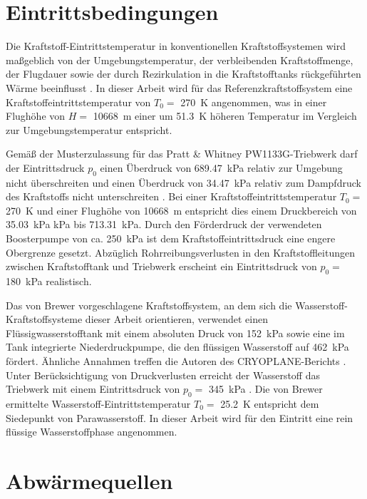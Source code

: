 \section{Eintrittsbedingungen}

Die Kraftstoff-Eintrittstemperatur in konventionellen Kraftstoffsystemen wird maßgeblich von der Umgebungstemperatur, der verbleibenden Kraftstoffmenge, der Flugdauer sowie der durch Rezirkulation in die Kraftstofftanks rückgeführten Wärme beeinflusst \cite{German.2012}. In dieser Arbeit wird für das Referenzkraftstoffsystem eine Kraftstoffeintrittstemperatur von $T_0=$ \SI{270}{\K} angenommen, was in einer Flughöhe von $H= $ \SI{10668}{\m} einer um \SI{51.3}{\K} höheren Temperatur im Vergleich zur Umgebungstemperatur entspricht. 

Gemäß der Musterzulassung für das Pratt \& Whitney PW1133G-Triebwerk darf der Eintrittsdruck $p_0$ einen Überdruck von \SI{689.47}{\kilo\Pa} relativ zur Umgebung nicht überschreiten und einen Überdruck von \SI{34.47}{\kilo\Pa} relativ zum Dampfdruck des Kraftstoffs nicht unterschreiten \cite{EASA.2018}. Bei einer Kraftstoffeintrittstemperatur $T_0=$ \SI{270}{\K} und einer Flughöhe von \SI{10668}{\m} entspricht dies einem Druckbereich von \SI{35.03}{\kilo\Pa} kPa bis \SI{713.31}{\kilo\Pa}. Durch den Förderdruck der verwendeten Boosterpumpe von ca. \SI{250}{\kilo\Pa} \cite{EatonFuelSystemsDivision.2013} ist dem Kraftstoffeintrittsdruck eine engere Obergrenze gesetzt. Abzüglich Rohrreibungsverlusten in den Kraftstoffleitungen zwischen Kraftstofftank und Triebwerk erscheint ein Eintrittsdruck von $p_0=$ \SI{180}{\kilo\Pa} realistisch.

Das von Brewer \cite{Brewer.1991} vorgeschlagene Kraftstoffsystem, an dem sich die Wasserstoff-Kraftstoffsysteme dieser Arbeit orientieren, verwendet einen Flüssigwasserstofftank mit einem absoluten Druck von \SI{152}{\kilo\Pa} sowie eine im Tank integrierte Niederdruckpumpe, die den flüssigen Wasserstoff auf \SI{462}{\kilo\Pa} fördert. Ähnliche Annahmen treffen die Autoren des CRYOPLANE-Berichts \cite{Scholz.2003}. Unter Berücksichtigung von Druckverlusten erreicht der Wasserstoff das Triebwerk mit einem Eintrittsdruck von $p_0=$ \SI{345}{\kilo\Pa} \cite{Brewer.1991}. Die von Brewer ermittelte Wasserstoff-Eintrittstemperatur $T_0=$ \SI{25.2}{\K} entspricht dem Siedepunkt von Parawasserstoff. In dieser Arbeit wird für den Eintritt eine rein flüssige Wasserstoffphase angenommen.

\section{Abwärmequellen}

